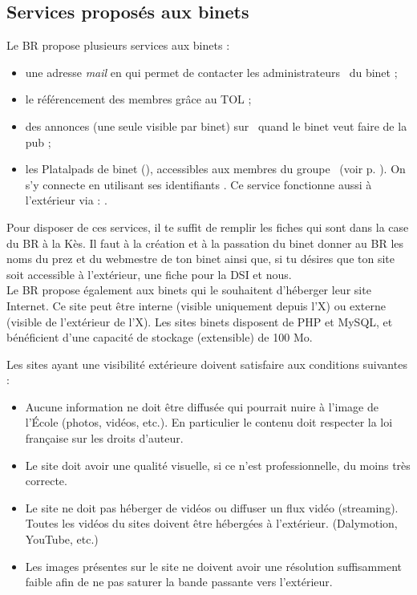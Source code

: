 \subsection{Services propos\'es aux binets}

Le BR propose plusieurs services aux binets :
\begin{itemize}
\item une adresse \emph{mail} en  qui permet de contacter les administrateurs \fkz\ du binet ;
\item le référencement des membres grâce au TOL ;
\item des annonces (une seule visible par binet) sur \fkz\ quand le binet veut faire de la pub ;
\item les Platalpads de binet (), accessibles aux membres du groupe \fkz\ (voir p. \pageref{platalpad}).
On s'y connecte en utilisant ses identifiants \fkz. Ce service fonctionne aussi \`a l'ext\'erieur via : \newline
{}.
\end{itemize}

Pour disposer de ces services, il te suffit de remplir les fiches qui sont dans la case du BR à la Kès. Il faut à la création et à la passation du binet
donner au BR les noms du prez et du webmestre de ton binet ainsi que, si tu désires que ton site soit accessible à l'extérieur, une fiche pour la DSI et nous.\\

\vspace{4mm}
Le BR propose également aux binets qui le souhaitent d'héberger leur site Internet. Ce site peut être interne (visible uniquement depuis l'X) ou externe (visible de l'extérieur de l'X).
Les sites binets disposent de PHP et MySQL, et bénéficient d'une capacité de stockage (extensible) de 100 Mo.

Les sites ayant une visibilité extérieure doivent satisfaire aux conditions suivantes :
\begin{itemize}
    \item Aucune information ne doit être diffusée qui pourrait nuire à l'image de l’École (photos, vidéos, etc.). En particulier le contenu doit respecter la loi française sur les droits d'auteur.
    \item Le site doit avoir une qualité visuelle, si ce n'est professionnelle, du moins très correcte.
    \item Le site ne doit pas héberger de vidéos ou diffuser un flux vidéo (streaming). Toutes les vidéos du sites doivent être hébergées à l'extérieur. (Dalymotion, YouTube, etc.)
    \item Les images présentes sur le site ne doivent avoir une résolution suffisamment faible afin de ne pas saturer la bande passante vers l'extérieur. 
\end{itemize}

